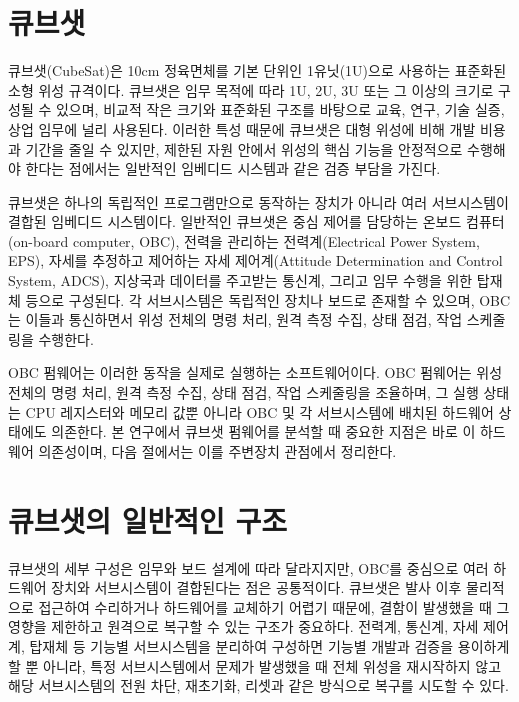 \documentclass[master,korean,final]{kaist-ucs}
\begin{document}
\section{큐브샛}

큐브샛(CubeSat)은 10cm 정육면체를 기본 단위인 1유닛(1U)으로 사용하는 표준화된 소형 위성 규격이다\cite{CDS}. 큐브샛은 임무 목적에 따라 1U, 2U, 3U 또는 그 이상의 크기로 구성될 수 있으며, 비교적 작은 크기와 표준화된 구조를 바탕으로 교육, 연구, 기술 실증, 상업 임무에 널리 사용된다. 이러한 특성 때문에 큐브샛은 대형 위성에 비해 개발 비용과 기간을 줄일 수 있지만, 제한된 자원 안에서 위성의 핵심 기능을 안정적으로 수행해야 한다는 점에서는 일반적인 임베디드 시스템과 같은 검증 부담을 가진다.

큐브샛은 하나의 독립적인 프로그램만으로 동작하는 장치가 아니라 여러 서브시스템이 결합된 임베디드 시스템이다. 일반적인 큐브샛은 중심 제어를 담당하는 온보드 컴퓨터(on-board computer, OBC), 전력을 관리하는 전력계(Electrical Power System, EPS), 자세를 추정하고 제어하는 자세 제어계(Attitude Determination and Control System, ADCS), 지상국과 데이터를 주고받는 통신계, 그리고 임무 수행을 위한 탑재체 등으로 구성된다. 각 서브시스템은 독립적인 장치나 보드로 존재할 수 있으며, OBC는 이들과 통신하면서 위성 전체의 명령 처리, 원격 측정 수집, 상태 점검, 작업 스케줄링을 수행한다.

OBC 펌웨어는 이러한 동작을 실제로 실행하는 소프트웨어이다. OBC 펌웨어는 위성 전체의 명령 처리, 원격 측정 수집, 상태 점검, 작업 스케줄링을 조율하며, 그 실행 상태는 CPU 레지스터와 메모리 값뿐 아니라 OBC 및 각 서브시스템에 배치된 하드웨어 상태에도 의존한다. 본 연구에서 큐브샛 펌웨어를 분석할 때 중요한 지점은 바로 이 하드웨어 의존성이며, 다음 절에서는 이를 주변장치 관점에서 정리한다.

\section{큐브샛의 일반적인 구조}

큐브샛의 세부 구성은 임무와 보드 설계에 따라 달라지지만, OBC를 중심으로 여러 하드웨어 장치와 서브시스템이 결합된다는 점은 공통적이다. 큐브샛은 발사 이후 물리적으로 접근하여 수리하거나 하드웨어를 교체하기 어렵기 때문에, 결함이 발생했을 때 그 영향을 제한하고 원격으로 복구할 수 있는 구조가 중요하다. 전력계, 통신계, 자세 제어계, 탑재체 등 기능별 서브시스템을 분리하여 구성하면 기능별 개발과 검증을 용이하게 할 뿐 아니라, 특정 서브시스템에서 문제가 발생했을 때 전체 위성을 재시작하지 않고 해당 서브시스템의 전원 차단, 재초기화, 리셋과 같은 방식으로 복구를 시도할 수 있다.
\end{document}
